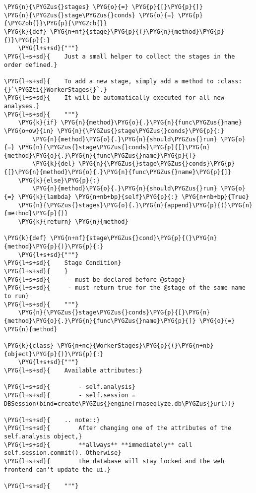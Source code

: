\begin{Verbatim}[commandchars=\\\{\}]
\PYG{n}{\PYGZus{}stages} \PYG{o}{=} \PYG{p}{[}\PYG{p}{]}
\PYG{n}{\PYGZus{}stage\PYGZus{}conds} \PYG{o}{=} \PYG{p}{\PYGZob{}}\PYG{p}{\PYGZcb{}}
\PYG{k}{def} \PYG{n+nf}{stage}\PYG{p}{(}\PYG{n}{method}\PYG{p}{)}\PYG{p}{:}
    \PYG{l+s+sd}{"""}
\PYG{l+s+sd}{    Just a small helper to collect the stages in the order defined.}

\PYG{l+s+sd}{    To add a new stage, simply add a method to :class:{}`\PYGZti{}WorkerStages{}`.}
\PYG{l+s+sd}{    It will be automatically executed for all new analyses.}
\PYG{l+s+sd}{    """}
    \PYG{k}{if} \PYG{n}{method}\PYG{o}{.}\PYG{n}{func\PYGZus{}name} \PYG{o+ow}{in} \PYG{n}{\PYGZus{}stage\PYGZus{}conds}\PYG{p}{:}
        \PYG{n}{method}\PYG{o}{.}\PYG{n}{should\PYGZus{}run} \PYG{o}{=} \PYG{n}{\PYGZus{}stage\PYGZus{}conds}\PYG{p}{[}\PYG{n}{method}\PYG{o}{.}\PYG{n}{func\PYGZus{}name}\PYG{p}{]}
        \PYG{k}{del} \PYG{n}{\PYGZus{}stage\PYGZus{}conds}\PYG{p}{[}\PYG{n}{method}\PYG{o}{.}\PYG{n}{func\PYGZus{}name}\PYG{p}{]}
    \PYG{k}{else}\PYG{p}{:}
        \PYG{n}{method}\PYG{o}{.}\PYG{n}{should\PYGZus{}run} \PYG{o}{=} \PYG{k}{lambda} \PYG{n+nb+bp}{self}\PYG{p}{:} \PYG{n+nb+bp}{True}
    \PYG{n}{\PYGZus{}stages}\PYG{o}{.}\PYG{n}{append}\PYG{p}{(}\PYG{n}{method}\PYG{p}{)}
    \PYG{k}{return} \PYG{n}{method}

\PYG{k}{def} \PYG{n+nf}{stage\PYGZus{}cond}\PYG{p}{(}\PYG{n}{method}\PYG{p}{)}\PYG{p}{:}
    \PYG{l+s+sd}{"""}
\PYG{l+s+sd}{    Stage Condition}
\PYG{l+s+sd}{    }
\PYG{l+s+sd}{     - must be declared before @stage}
\PYG{l+s+sd}{     - must return true for the @stage of the same name to run}
\PYG{l+s+sd}{    """}
    \PYG{n}{\PYGZus{}stage\PYGZus{}conds}\PYG{p}{[}\PYG{n}{method}\PYG{o}{.}\PYG{n}{func\PYGZus{}name}\PYG{p}{]} \PYG{o}{=} \PYG{n}{method}

\PYG{k}{class} \PYG{n+nc}{WorkerStages}\PYG{p}{(}\PYG{n+nb}{object}\PYG{p}{)}\PYG{p}{:}
    \PYG{l+s+sd}{"""}
\PYG{l+s+sd}{    Available attributes:}

\PYG{l+s+sd}{        - self.analysis}
\PYG{l+s+sd}{        - self.session = DBSession(bind=create\PYGZus{}engine(rnaseqlyze.db\PYGZus{}url))}

\PYG{l+s+sd}{    .. note::}
\PYG{l+s+sd}{        After changing one of the attributes of the self.analysis object,}
\PYG{l+s+sd}{        **allways** **immediately** call self.session.commit(). Otherwise}
\PYG{l+s+sd}{        the database will stay locked and the web frontend can't update the ui.}

\PYG{l+s+sd}{    """}


\end{Verbatim}
